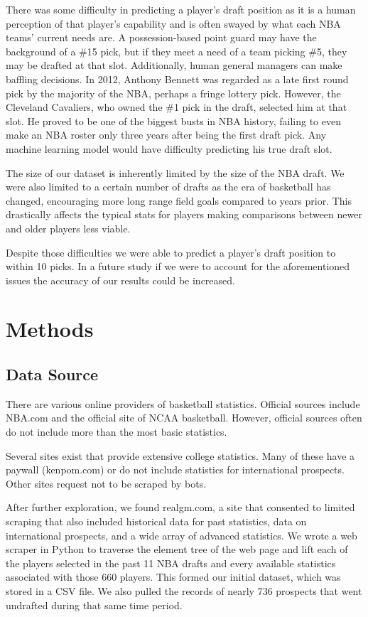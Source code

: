 \documentclass{article}
\begin{document}
There was some difficulty in predicting a player’s draft position as it is a
human perception of that player’s capability and is often swayed by what each
NBA teams’ current needs are. A possession-based point guard may have the
background of a \#15 pick, but if they meet a need of a team picking \#5, they
may be drafted at that slot. Additionally, human general managers can make
baffling decisions. In 2012, Anthony Bennett was regarded as a late first round
pick by the majority of the NBA, perhaps a fringe lottery pick. However, the
Cleveland Cavaliers, who owned the \#1 pick in the draft, selected him at that
slot. He proved to be one of the biggest busts in NBA history, failing to even
make an NBA roster only three years after being the first draft pick. Any
machine learning model would have difficulty predicting his true draft slot.

The size of our dataset is inherently limited by the size of the NBA draft. We
were also limited to a certain number of drafts as the era of basketball has
changed, encouraging more long range field goals compared to years prior. This
drastically affects the typical stats for players making comparisons between
newer and older players less viable.

Despite those difficulties we were able to predict a player’s draft position to
within 10 picks. In a future study if we were to account for the aforementioned
issues the accuracy of our results could be increased.

\section{Methods}

\subsection{Data Source}

There are various online providers of basketball statistics. Official sources
include NBA.com and the official site of NCAA basketball. However, official
sources often do not include more than the most basic statistics.

Several sites exist that provide extensive college statistics. Many of these
have a paywall (kenpom.com) or do not include statistics for international
prospects. Other sites request not to be scraped by bots.

After further exploration, we found realgm.com, a site that consented to limited
scraping that also included historical data for past statistics, data on
international prospects, and a wide array of advanced statistics. We wrote a web
scraper in Python to traverse the element tree of the web page and lift each of
the players selected in the past 11 NBA drafts and every available statistics
associated with those 660 players. This formed our initial dataset, which was
stored in a CSV file. We also pulled the records of nearly 736 prospects that
went undrafted during that same time period. 
\end{document}
